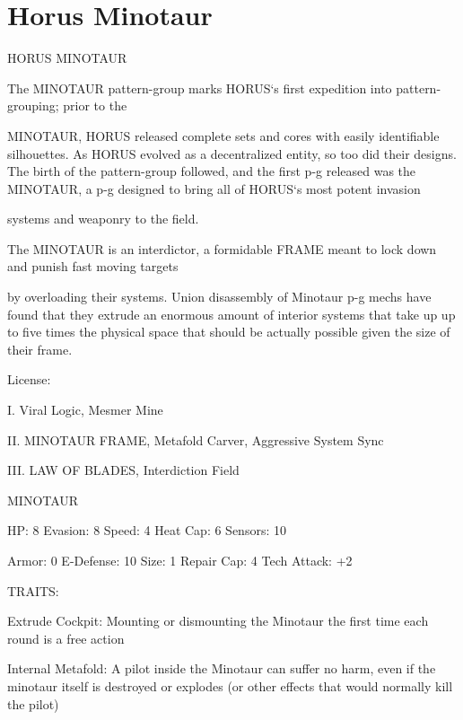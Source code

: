 \section{Horus Minotaur}


                                          HORUS MINOTAUR

The MINOTAUR pattern-group marks HORUS‘s first expedition into pattern-grouping; prior to the

MINOTAUR, HORUS released complete sets and cores with easily identifiable silhouettes. As HORUS
evolved as a decentralized entity, so too did their designs. The birth of the pattern-group followed, and the
first p-g released was the MINOTAUR, a p-g designed to bring all of HORUS‘s most potent invasion

systems and weaponry to the field.

The MINOTAUR is an interdictor, a formidable FRAME meant to lock down and punish fast moving targets

by overloading their systems. Union disassembly of Minotaur p-g mechs have found that they extrude an
enormous amount of interior systems that take up up to five times the physical space that should be
actually possible given the size of their frame.

                                                    License:

I. Viral Logic, Mesmer Mine

II. MINOTAUR FRAME, Metafold Carver, Aggressive System Sync

III. LAW OF BLADES, Interdiction Field


                                                 MINOTAUR

 HP: 8           Evasion: 8                            Speed: 4            Heat Cap: 6        Sensors: 10

 Armor: 0        E-Defense: 10                         Size: 1             Repair Cap: 4      Tech Attack:
                                                                                              +2

                                                    TRAITS:

 Extrude Cockpit: Mounting or dismounting the Minotaur the first time each round is a free action

 Internal Metafold: A pilot inside the Minotaur can suffer no harm, even if the minotaur itself is
 destroyed or explodes (or other effects that would normally kill the pilot)

